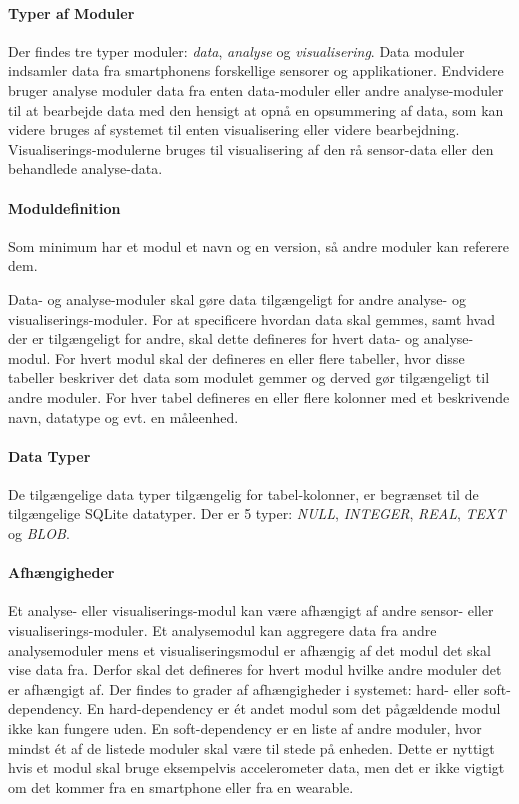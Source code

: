 \paragraph{Typer af Moduler}
Der findes tre typer moduler: \textit{data}, \textit{analyse} og \textit{visualisering}.
Data moduler indsamler data fra smartphonens forskellige sensorer og applikationer.
Endvidere bruger analyse moduler data fra enten data-moduler eller andre analyse-moduler til at bearbejde data med den hensigt at opnå en opsummering af data, som kan videre bruges af systemet til enten visualisering eller videre bearbejdning.
Visualiserings-modulerne bruges til visualisering af den rå sensor-data eller den behandlede analyse-data.

\paragraph{Moduldefinition}
Som minimum har et modul et navn og en version, så andre moduler kan referere dem.

Data- og analyse-moduler skal gøre data tilgængeligt for andre analyse- og visualiserings-moduler.
For at specificere hvordan data skal gemmes, samt hvad der er tilgængeligt for andre, skal dette defineres for hvert data- og analyse-modul.
For hvert modul skal der defineres en eller flere tabeller, hvor disse tabeller beskriver det data som modulet gemmer og derved gør tilgængeligt til andre moduler.
For hver tabel defineres en eller flere kolonner med et beskrivende navn, datatype og evt. en måleenhed.

\paragraph{Data Typer}
De tilgængelige data typer tilgængelig for tabel-kolonner, er begrænset til de tilgængelige SQLite datatyper.
Der er 5 typer: \textit{NULL}, \textit{INTEGER}, \textit{REAL}, \textit{TEXT} og \textit{BLOB}.

\paragraph{Afhængigheder}
Et analyse- eller visualiserings-modul kan være afhængigt af andre sensor- eller visualiserings-moduler.
Et analysemodul kan aggregere data fra andre analysemoduler mens et visualiseringsmodul er afhængig af det modul det skal vise data fra.
Derfor skal det defineres for hvert modul hvilke andre moduler det er afhængigt af.
Der findes to grader af afhængigheder i systemet: hard- eller soft-dependency.
En hard-dependency er ét andet modul som det pågældende modul ikke kan fungere uden.
En soft-dependency er en liste af andre moduler, hvor mindst ét af de listede moduler skal være til stede på enheden.
Dette er nyttigt hvis et modul skal bruge eksempelvis accelerometer data, men det er ikke vigtigt om det kommer fra en smartphone eller fra en wearable.

